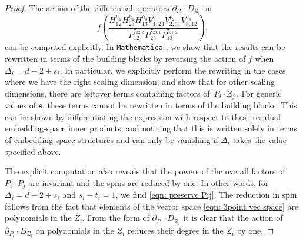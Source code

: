 \documentclass[12pt,a4paper]{extarticle}
\theoremstyle{definition}
\begin{document}
\begin{proof}
The action of the differential operators $\partial_{P_i}\cdot D_{Z_i}$ on
\begin{equation}\label{eqn: embedding space monomial}
    f\left(\frac{H^{h_{1}}_{12}H^{h_{2}}_{23}H^{h_{3}}_{13}V^{v_1}_{1,23}V^{v_2}_{2,31}V^{v_3}_{3,12}}{P^{\tau_{12,3}}_{12}P^{\tau_{23,1}}_{23}P^{\tau_{31,2}}_{13}}\right),
\end{equation}
can be computed explicitly. In \texttt{Mathematica} \cite{zenodo}, we show that the results can be rewritten in terms of the building blocks by reversing the action of $f$ when $\Delta_i=d-2+s_i$. In particular, we explicitly perform the rewriting in the cases where we have the right scaling dimension, and show that for other scaling dimensions, there are leftover terms containing factors of $\, P_i \cdot Z_j\,$. For generic values of $\mathbf{s}$, these terms cannot be rewritten in terms of the building blocks. This can be shown by differentiating the expression with respect to these residual embedding-space inner products, and noticing that this is written solely in terms of embedding-space structures and can only be vanishing if $\Delta_i$ takes the value specified above.

\smallskip

The explicit computation also reveals that the powers of the overall factors of $P_i\cdot P_j$ are invariant and the spins are reduced by one.
In other words, for $\Delta_i=d-2+s_i$ and $s_i-t_i=1$, we find \eqref{eqn: preserve Pij}. The reduction in spin follows from the fact that elements of the vector space \eqref{eqn: 3point vec space} are polynomials in the $Z_i$. From the form of $\partial_{P_i}\cdot D_{Z_i}$ it is clear that the action of $\partial_{P_i}\cdot D_{Z_i}$ on polynomials in the $Z_i$ reduces their degree in the $Z_i$ by one.
\end{proof}
\end{document}
